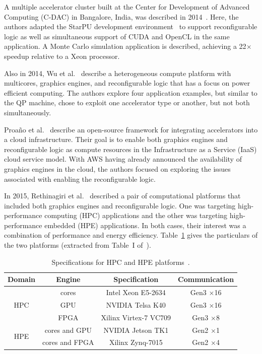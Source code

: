 A multiple accelerator cluster built at the Center for Development of
Advanced Computing (C-DAC) in Bangalore, India, was described in
2014~\cite{admb14}. Here, the authors adapted the StarPU development
environment~\cite{starpu} to support reconfigurable logic as well as
simultaneous support of CUDA and OpenCL in the same application.
A Monte Carlo simulation application is described, achieving a 22$\times$
speedup relative to a Xeon processor.

Also in 2014, Wu et al.~\cite{whk+14} describe a heterogeneous compute
platform with multicores, graphics engines, and reconfigurable logic
that has a focus on power efficient computing.
The authors explore four application examples, but similar to the QP
machine, chose to exploit one accelerator type or another, but not both
simultaneously.

Proa\~no et al.~\cite{pcc14} describe an open-source framework for
integrating accelerators into a cloud infrastructure.  Their goal is
to enable both graphics engines and reconfigurable logic as compute resources
in the Infrastructure as a Service (IaaS) cloud service model.
With AWS having already announced the availability of graphics engines
in the cloud, the authors focused on exploring the issues associated
with enabling the reconfigurable logic.

In 2015, Rethinagiri et al.~\cite{rpm+15} described a pair of computational
platforms that included both graphics engines and reconfigurable logic.  One
was targeting high-performance computing (HPC) applications and the other
was targeting high-performance embedded (HPE) applications.
In both cases, their interest was a combination of performance and
energy efficiency. Table~\ref{tbl:hpchpe} gives the particulars of
the two platforms (extracted from Table~I of~\cite{rpm+15}).

\begin{table}[ht]
\centering
\caption{Specifications for HPC and HPE platforms~\protect\cite{rpm+15}.}
\label{tbl:hpchpe}
\vspace{0.1in}
\begin{tabular}{c | c | c | c}
Domain & Engine & Specification & Communication \\ \hline
\multirow{3}{*}{HPC} & cores & Intel Xeon E5-2634 & Gen3 $\times$16 \\ \cline{2-4}
 & GPU & NVIDIA Telsa K40 & Gen3 $\times$16 \\ \cline{2-4}
 & FPGA & Xilinx Virtex-7 VC709 & Gen3 $\times$8 \\ \hline
\multirow{2}{*}{HPE} & cores and GPU & NVIDIA Jetson TK1 & Gen2 $\times$1 \\ \cline{2-4}
 & cores and FPGA & Xilinx Zynq-7015 & Gen2 $\times$4
\end{tabular}
\end{table}

